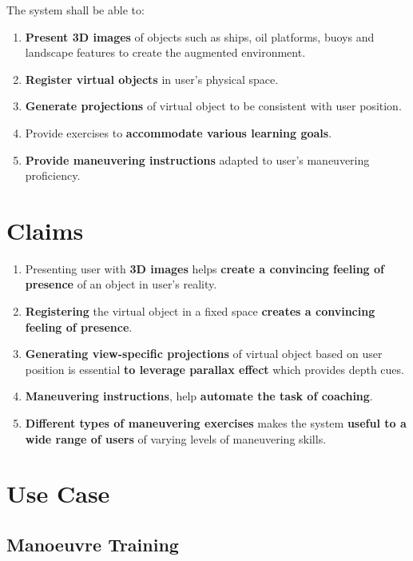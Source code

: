 The system shall be able to:
\begin{enumerate}[itemsep=0.01em]
\item \textbf{Present 3D images} of objects such as ships, oil platforms, buoys and landscape features to create the augmented environment.
\item \textbf{Register virtual objects} in user’s physical space.
\item \textbf{Generate projections} of virtual object to be consistent with user position.
\item Provide exercises to \textbf{accommodate various learning goals}. 
\item \textbf{Provide maneuvering instructions} adapted to user's maneuvering proficiency.
\end{enumerate}

\section{Claims}
\label{sec:claims}
\begin{enumerate}[itemsep=0.01em]
	\item Presenting user with \textbf{3D images} helps \textbf{create a convincing feeling of presence} of an object in user’s reality. 
	\item \textbf{Registering} the virtual object in a fixed space \textbf{creates a convincing feeling of presence}.
	\item \textbf{Generating view-specific projections} of virtual object based on user position is essential \textbf{to leverage parallax effect} which provides depth cues.
	\item \textbf{Maneuvering instructions}, help \textbf{automate the task of coaching}. 
	\item \textbf{Different types of maneuvering exercises} makes the system \textbf{useful to a wide range of users} of varying levels of maneuvering skills.
\end{enumerate}

\section{Use Case}
\label{sec:usecase}
\subsection{Manoeuvre Training}


